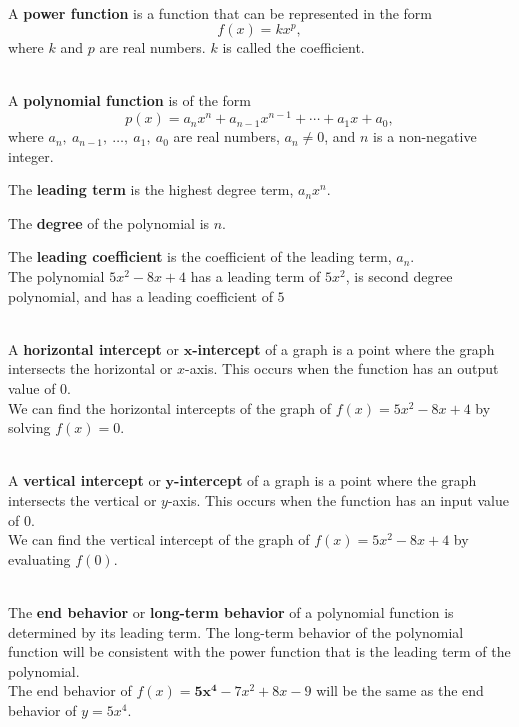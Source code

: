 \begin{myDefinition}~\\[0.5mm]
A {\bf power function} is a function that can be represented in the form $${f(x) = kx^p},$$
where $k$ and $p$ are real numbers.  $k$ is called the coefficient.
\end{myDefinition}

\begin{myDefinition}~\\[0.5mm]
A \textbf{polynomial function} is of the form $${p(x) = a_n x^n + a_{n-1} x^{n-1} + \cdots + a_1 x + a_0},$$
where $a_n, ~a_{n-1}, ~\dots,~ a_1, ~a_0$ are real numbers, $a_n\neq 0$, and $n$ is a non-negative integer.
			
The \textbf{leading term} is the highest degree term, $a_n x^n$. 

The \textbf{degree} of the polynomial is $n$.
			
The \textbf{leading coefficient} is the coefficient of the leading term, $a_n$. \\[0.5em]
 The polynomial $5x^2-8x+4$ has a leading term of $5x^2$, is second degree polynomial,  and has a leading coefficient of $5$
\end{myDefinition}


\begin{myDefinition}~\\[0.5mm]
A {\bf horizontal intercept} or {\bf $\boldsymbol{x}$-intercept} of a graph is a point where the graph intersects the horizontal or $x$-axis.  This occurs when the function has an output value of 0.\\[0.5em]
 We can find the horizontal intercepts of the graph of $f(x) = 5x^2-8x+4$ by solving $f(x)=0$.
\end{myDefinition}

\begin{myDefinition}~\\[0.5mm]
A {\bf vertical intercept} or {\bf $\boldsymbol{y}$-intercept} of a graph is a point where the graph intersects the vertical or $y$-axis.  This occurs when the function has an input value of 0.\\[0.5em]
 We can find the vertical intercept of the graph of $f(x) = 5x^2-8x+4$ by evaluating $f(0)$.
\end{myDefinition}

\begin{myDefinition}~\\[0.5mm]
The {\bf end behavior} or {\bf long-term behavior} of a polynomial function is determined by its leading term.  The long-term behavior of the polynomial function will be consistent with the power function that is the leading term of the polynomial.\\[0.5em]
 The end behavior of $f(x) = \boldsymbol{5x^4}{}-7x^2+8x-9$ will be the same as the end behavior of $y=5x^4$.
\end{myDefinition}


